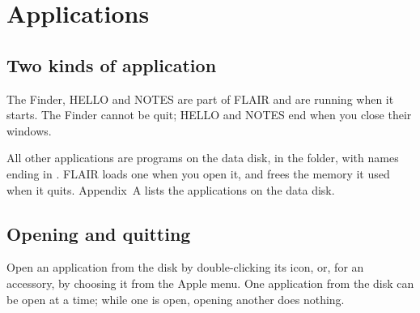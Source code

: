 \chapter{Applications}
\label{ch:appsref}

\section{Two kinds of application}
The Finder, HELLO and NOTES are part of FLAIR and are
running when it starts.  The Finder cannot be quit; HELLO and NOTES end when
you close their windows.

All other applications are programs on the data
disk, in the  folder, with names ending in .  FLAIR
loads one when you open it, and frees the memory it used when it quits.
Appendix~A lists the applications on the data disk.

\section{Opening and quitting}
Open an application from the disk by double-clicking its icon, or, for an
accessory, by choosing it from the Apple menu.  One application from the
disk can be open at a time; while one is open, opening another does
nothing.

